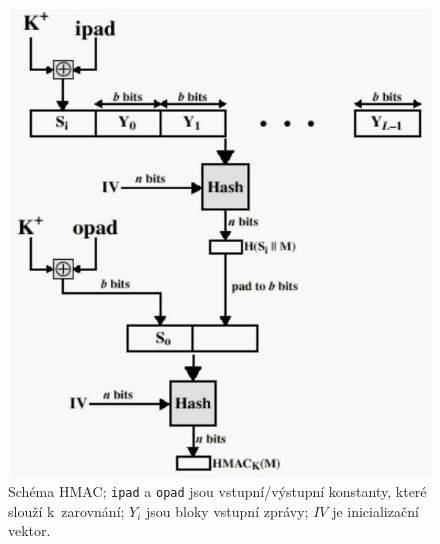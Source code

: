 \begin{figure}[H]
    \centering
    \includegraphics[width=0.9\linewidth]{hmac.png}
    \caption{Schéma HMAC; \texttt{ipad} a \texttt{opad} jsou vstupní/výstupní konstanty, které slouží k~zarovnání; $Y_i$ jsou bloky vstupní zprávy; $IV$ je inicializační vektor.}
\end{figure}
